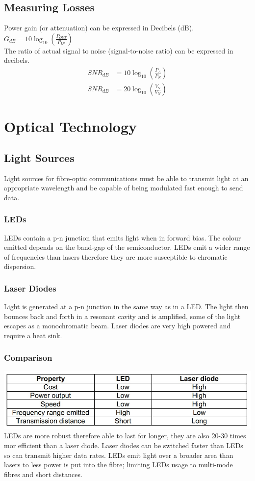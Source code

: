 \documentclass[a4paper,11pt, twocolumn]{article}
\begin{document}
\subsection{Measuring Losses}
Power gain (or attenuation) can be expressed in Decibels (dB).\\
$\displaystyle G_{dB} = 10\log_{10}\left(\displaystyle \frac{P_{OUT}}{P_{IN}} \right)$\\
The ratio of actual signal to noise (signal-to-noise ratio) can be expressed in decibels.
\begin{align*}
    SNR_{dB} &= 10\log_{10} \left( \frac{P_S}{P_N} \right)\\
    SNR_{dB} &= 20\log_{10} \left( \frac{V_S}{V_N} \right)
\end{align*}

\section{Optical Technology}
\subsection{Light Sources}
Light sources for fibre-optic communications must be able to transmit light at an appropriate wavelength and be capable of being modulated fast enough to send data.
\subsubsection{LEDs}
LEDs contain a p-n junction that emits light when in forward bias. The colour emitted depends on the band-gap of the semiconductor. LEDs emit a wider range of frequencies than lasers therefore they are more susceptible to chromatic dispersion.
\subsubsection{Laser Diodes}
Light is generated at a p-n junction in the same way as in a LED. The light then bounces back and forth in a resonant cavity and is amplified, some of the light escapes as a monochromatic beam. Laser diodes are very high powered and require a heat sink.
\subsubsection{Comparison}
\includegraphics[width=\linewidth]{comparisonOfLaserLED.jpg}
LEDs are more robust therefore able to last for longer, they are also 20-30 times mor efficient than a laser diode. Laser diodes can be switched faster than LEDs so can transmit higher data rates. LEDs emit light over a broader area than lasers to less power is put into the fibre; limiting LEDs usage to multi-mode fibres and short distances.
\end{document}
